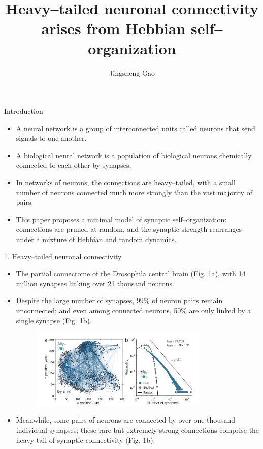 \documentclass[
  notheorems,
  aspectratio=54,
]{beamer}
\title{Heavy–tailed neuronal connectivity arises from Hebbian self–organization}
\author{Jingsheng Gao}
\institute{Anqing Normal University}
\begin{document}
\begin{frame}
    \titlepage
\end{frame}

\begin{frame}{Introduction}
 \begin{itemize}
    \item A neural network is a group of interconnected units called neurons that send signals to one another.
    \item A biological neural network is a population of biological neurons chemically connected to each other by synapses.
    \item In networks of neurons, the connections are heavy–tailed, with a small number of neurons connected much more strongly than the vast majority of pairs.
    \item This paper proposes a minimal model of synaptic self–organization: connections are pruned at random, and the synaptic strength rearranges under a mixture of Hebbian and random dynamics.
  \end{itemize}
\end{frame}

\begin{frame}{1. Heavy–tailed neuronal connectivity}
  \begin{figure}
    \centering
  \end{figure}
  \begin{itemize}
    \item The partial connectome of the Drosophila central brain (Fig. 1a), with 14 million synapses linking over 21 thousand neurons.
    \item Despite the large number of synapses, 99\% of neuron pairs remain unconnected; and even among connected neurons, 50\% are only linked by a single synapse (Fig. 1b).
      \begin{figure}
        \begin{minipage}[b]{0.8\textwidth}
          \includegraphics[width=0.8\textwidth]{Drosophila.png}
        \end{minipage}
      \end{figure}
    \item Meanwhile, some
pairs of neurons are connected by over one thousand individual synapses; these rare but extremely
strong connections comprise the heavy tail of synaptic connectivity (Fig. 1b).
  \end{itemize}
\end{frame}
\end{document}
